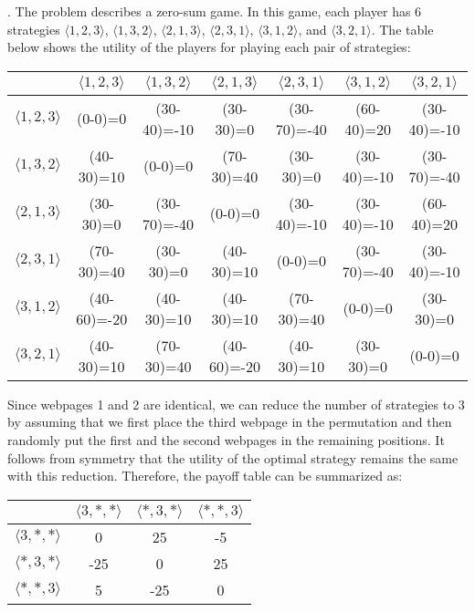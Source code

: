 \begin{solution}.
The problem describes a zero-sum game. In this game, each player has 6 strategies $\langle 1, 2, 3 \rangle$, $\langle 1, 3, 2 \rangle$, $\langle 2, 1, 3 \rangle$, $\langle 2, 3, 1 \rangle$, $\langle 3, 1, 2 \rangle$,  and $\langle 3, 2, 1 \rangle$. The table below shows the utility of the players for playing each pair of strategies:

\begin{center}
\begin{tabular}{|c|c|c|c|c|c|c|}
\hline
& $\langle 1, 2, 3\rangle$& $\langle 1, 3, 2\rangle$& $\langle 2, 1, 3\rangle$& $\langle 2, 3, 1\rangle$& $\langle 3, 1, 2\rangle$& $\langle 3, 2, 1\rangle$\\
\hline
$\langle 1, 2, 3\rangle$& (0-0)=0& (30-40)=-10& (30-30)=0& (30-70)=-40& (60-40)=20& (30-40)=-10\\
\hline
$\langle 1, 3, 2\rangle$& (40-30)=10& (0-0)=0& (70-30)=40& (30-30)=0& (30-40)=-10& (30-70)=-40\\
\hline
$\langle 2, 1, 3\rangle$& (30-30)=0& (30-70)=-40& (0-0)=0& (30-40)=-10& (30-40)=-10& (60-40)=20\\
\hline
$\langle 2, 3, 1\rangle$& (70-30)=40& (30-30)=0& (40-30)=10& (0-0)=0& (30-70)=-40& (30-40)=-10\\
\hline
$\langle 3, 1, 2\rangle$& (40-60)=-20& (40-30)=10& (40-30)=10& (70-30)=40& (0-0)=0& (30-30)=0\\
\hline
$\langle 3, 2, 1\rangle$& (40-30)=10& (70-30)=40& (40-60)=-20& (40-30)=10& (30-30)=0& (0-0)=0\\

\hline
\end{tabular}
\end{center}

Since webpages 1 and 2 are identical, we can reduce the number of strategies to 3 by assuming that we first place the third webpage in the permutation and then randomly put the first and the second webpages in the remaining positions. It follows from symmetry that the utility of the optimal strategy remains the same with this reduction. Therefore, the payoff table can be summarized as:

\begin{center}
\begin{tabular}{|c|c|c|c|}
\hline
& $\langle 3, *, *\rangle$& $\langle *, 3, *\rangle$& $\langle *, *, 3\rangle$\\
\hline
$\langle 3, *, *\rangle$& 0& 25& -5\\
\hline
$\langle *, 3, *\rangle$& -25& 0& 25\\
\hline
$\langle *, *, 3\rangle$& 5& -25& 0\\
\hline
\end{tabular}
\end{center}


\end{solution}
